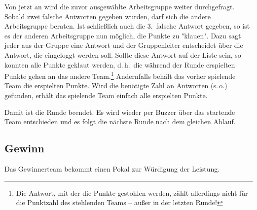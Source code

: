 \documentclass[a4paper, 12pt, pagesize, headlines=2.1, headsepline, german, ngerman]{scrartcl}
\begin{document}
Von jetzt an wird die zuvor ausgewählte Arbeitsgruppe weiter durchgefragt. Sobald zwei falsche Antworten gegeben wurden, darf sich die andere Arbeitsgruppe beraten. Ist schließlich auch die 3.\ falsche Antwort gegeben, so ist es der anderen Arbeitsgruppe nun möglich, die Punkte zu "klauen". Dazu sagt jeder aus der Gruppe eine Antwort und der Gruppenleiter entscheidet über die Antwort, die eingeloggt werden soll. Sollte diese Antwort auf der Liste sein, so konnten alle Punkte geklaut werden, d.\,h.\ die während der Runde erspielten Punkte gehen an das andere Team.\footnote{Die Antwort, mit der die Punkte gestohlen werden, zählt allerdings nicht für die Punktzahl des stehlenden Teams -- außer in der letzten Runde!} Andernfalls behält das vorher spielende Team die erspielten Punkte. Wird die benötigte Zahl an Antworten (s.\,o.) gefunden, erhält das spielende Team einfach alle erspielten Punkte.

Damit ist die Runde beendet. Es wird wieder per Buzzer über das startende Team entschieden und es folgt die nächste Runde nach dem gleichen Ablauf.

\subsection*{Gewinn}
Das Gewinnerteam bekommt einen Pokal zur Würdigung der Leistung.
\end{document}
